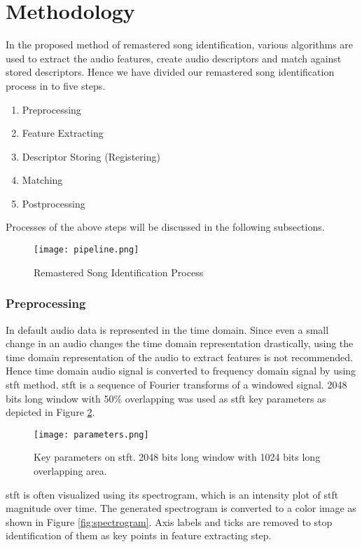 \section{Methodology}

In the proposed method of remastered song identification, various algorithms are used to
extract the audio features, create audio descriptors and match against stored descriptors.
Hence we have divided our remastered song identification process in to five steps.

\begin{enumerate}
    \item Preprocessing
    \item Feature Extracting
    \item Descriptor Storing (Registering)
    \item Matching
    \item Postprocessing
  \end{enumerate}

Processes of the above steps will be discussed in the following subsections.

\begin{figure}[h]
    \centering
    \texttt{[image: pipeline.png]}
    \caption{Remastered Song Identification Process}
    \label{fig:pipeline}
\end{figure}


\subsubsection{Preprocessing}

In default audio data is represented in the time domain. Since even a small change in an audio changes the time domain representation drastically,
using the time domain representation of the audio to extract features is not recommended. Hence time domain audio signal is converted to
frequency domain signal by using \ac{stft} method. \ac{stft} is a sequence of Fourier transforms of a windowed signal\cite{Kehtarnavaz2008}.
2048 bits long window with 50\% overlapping was used as \ac{stft} key parameters as depicted in Figure \ref{fig:parameters}.

\begin{figure}[h]
  \centering
  \texttt{[image: parameters.png]}
  \caption{Key parameters on \ac{stft}. 2048 bits long window with 1024 bits long overlapping area.}
  \label{fig:parameters}
\end{figure}

\ac{stft} is often visualized using its spectrogram\cite{Kehtarnavaz2008}, which is an intensity plot of \ac{stft} magnitude over time. 
The generated spectrogram is converted to a color image as shown in Figure \ref{fig:spectrogram}. Axis labels and ticks are removed to stop
identification of them as key points in feature extracting step. 

